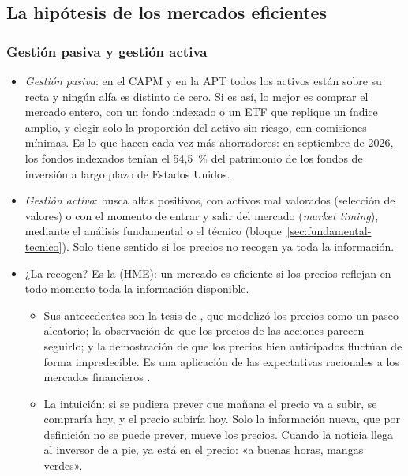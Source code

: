 \documentclass[11pt]{article}
\begin{document}
\subsection{La hipótesis de los mercados eficientes}\label{sec:emh}

\subsubsection{Gestión pasiva y gestión activa}\label{sec:gestion-pasiva-activa}

\begin{itemize}
\item \emph{Gestión pasiva}: en el CAPM y en la APT todos los activos están sobre su recta y ningún alfa es distinto de cero. Si es así, lo mejor es comprar el mercado entero, con un fondo indexado o un ETF que replique un índice amplio, y elegir solo la proporción del activo sin riesgo, con comisiones mínimas. Es lo que hacen cada vez más ahorradores: en septiembre de 2026, los fondos indexados tenían el 54,5~\% del patrimonio de los fondos de inversión a largo plazo de Estados Unidos\nocite{ICI2026ActiveIndex}.
\item \emph{Gestión activa}: busca alfas positivos, con activos mal valorados (selección de valores) o con el momento de entrar y salir del mercado (\emph{market timing}), mediante el análisis fundamental o el técnico (bloque~\ref{sec:fundamental-tecnico}). Solo tiene sentido si los precios no recogen ya toda la información.
\item ¿La recogen? Es la  (HME): un mercado es eficiente si los precios reflejan en todo momento toda la información disponible\nocite{Fama1970Efficient}.
  \begin{itemize}
  \item Sus antecedentes son la tesis de \textcite{Bachelier1900Theorie}, que modelizó los precios como un paseo aleatorio; la observación de que los precios de las acciones parecen seguirlo\nocite{Kendall1953Prices}; y la demostración de que los precios bien anticipados fluctúan de forma impredecible\nocite{Samuelson1965Proof}. Es una aplicación de las expectativas racionales a los mercados financieros .
  \item La intuición: si se pudiera prever que mañana el precio va a subir, se compraría hoy, y el precio subiría hoy. Solo la información nueva, que por definición no se puede prever, mueve los precios. Cuando la noticia llega al inversor de a pie, ya está en el precio: «a buenas horas, mangas verdes».
  \end{itemize}
\end{itemize}
\end{document}
